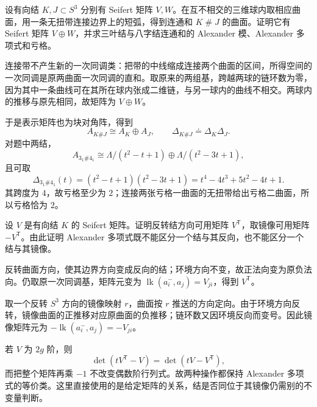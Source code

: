 \begin{exercise}\label{g2:ex:alexander-connected-sum}
	设有向结 \(K,J\subset S^3\) 分别有 Seifert 矩阵 \(V,W\)。在互不相交的三维球内取相应曲面，用一条无扭带连接边界上的短弧，得到连通和 \(K\mathbin{\#}J\) 的曲面。证明它有 Seifert 矩阵 \(V\oplus W\)，并求三叶结与八字结连通和的 Alexander 模、Alexander 多项式和亏格。
\end{exercise}
\begin{solution}
	连接带不产生新的一次同调类：把带的中线缩成连接两个曲面的区间，所得空间的一次同调是原两曲面一次同调的直和。取原来的两组基，跨越两球的链环数为零，因为其中一条曲线可在其所在球内张成二维链，与另一球内的曲线不相交。两球内的推移与原先相同，故矩阵为 \(V\oplus W\)。

	于是表示矩阵也为块对角阵，得到
	\[
		A_{K\#J}\cong A_K\oplus A_J,
		\qquad \Delta_{K\#J}\doteq\Delta_K\Delta_J.
	\]
	对题中两结，
	\[
		A_{3_1\#4_1}\cong
		\Lambda/(t^2-t+1)\oplus\Lambda/(t^2-3t+1),
	\]
	且可取
	\[
		\Delta_{3_1\#4_1}(t)
		=(t^2-t+1)(t^2-3t+1)
		=t^4-4t^3+5t^2-4t+1.
	\]
	其跨度为 \(4\)，故亏格至少为 \(2\)；连接两张亏格一曲面的无扭带给出亏格二曲面，所以亏格恰为 \(2\)。
\end{solution}

\begin{exercise}\label{g2:ex:alexander-mirror-reversal}
	设 \(V\) 是有向结 \(K\) 的 Seifert 矩阵。证明反转结方向可用矩阵 \(V^{\mathsf T}\)，取镜像可用矩阵 \(-V^{\mathsf T}\)。由此证明 Alexander 多项式既不能区分一个结与其反向，也不能区分一个结与其镜像。
\end{exercise}
\begin{solution}
	反转曲面方向，使其边界方向变成反向的结；环境方向不变，故正法向变为原负法向。仍取原一次同调基，矩阵元变为 \(\operatorname{lk}(a_i^-,a_j)=V_{ji}\)，得到 \(V^{\mathsf T}\)。

	取一个反转 \(S^3\) 方向的镜像映射 \(r\)，曲面按 \(r\) 推送的方向定向。由于环境方向反转，镜像曲面的正推移对应原曲面的负推移；链环数又因环境反向而变号。因此镜像矩阵元为 \(-\operatorname{lk}(a_i^-,a_j)=-V_{ji}\)。

	若 \(V\) 为 \(2g\) 阶，则
	\[
		\det(tV^{\mathsf T}-V)=\det(tV-V^{\mathsf T}),
	\]
	而把整个矩阵再乘 \(-1\) 不改变偶数阶行列式。故两种操作都保持 Alexander 多项式的等价类。这里直接使用的是给定矩阵的关系，结是否同位于其镜像仍需别的不变量判断。
\end{solution}


